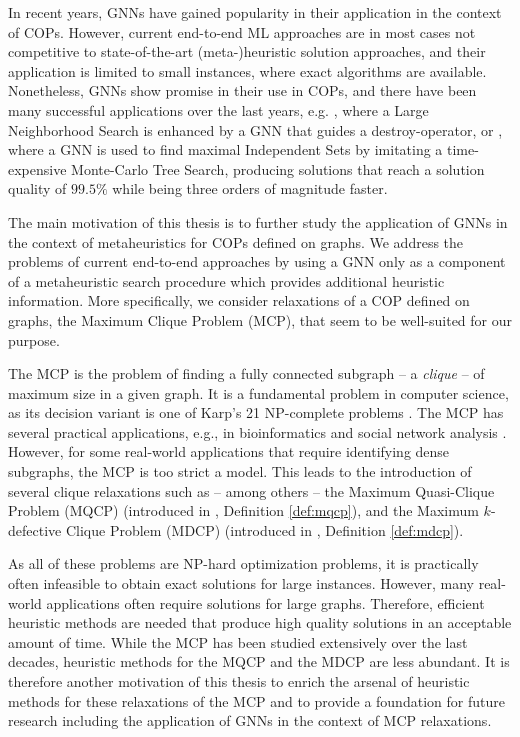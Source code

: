 \documentclass[draft,final]{vutinfth} %
\begin{document}
In recent years, GNNs have gained popularity in their application in the context of COPs. However, current end-to-end ML approaches are in most cases not competitive to state-of-the-art (meta-)heuristic solution approaches, and their application is limited to small instances, where exact algorithms are available. Nonetheless, GNNs show promise in their use in COPs, and there have been many successful applications over the last years, e.g. 
\cite{Oberweger2022}, where a Large Neighborhood Search is enhanced by a GNN that guides a destroy-operator, or \cite{NEURIPS2021_0db2e204}, where a GNN is used to find maximal Independent Sets by imitating a time-expensive Monte-Carlo Tree Search, producing solutions that reach a solution quality of $99.5\%$ while being three orders of magnitude faster. 

The main motivation of this thesis is to further study the application of GNNs in the context of metaheuristics for COPs defined on graphs. We address the problems of current end-to-end approaches by using a GNN only as a component of a metaheuristic search procedure which provides additional heuristic information. More specifically, we consider relaxations of a COP defined on graphs, the Maximum Clique Problem (MCP), that seem to be well-suited for our purpose. 

The MCP is the problem of finding a fully connected subgraph -- a \textit{clique} -- of maximum size in a given graph. It is a fundamental problem in computer science, as its decision variant is one of Karp's 21 NP-complete problems \cite{Karp1972}. The MCP has several practical applications, e.g.,  in bioinformatics \cite{Dognin2010} and social network analysis \cite{Pattillo_network_analysis_2013}. However, for some real-world applications that require identifying dense subgraphs, the MCP is too strict a model. This leads to the introduction of several clique relaxations such as -- among others -- the Maximum Quasi-Clique Problem (MQCP) (introduced in \cite{Abello2002}, Definition \ref{def:mqcp}), and the Maximum $k$-defective Clique Problem (MDCP) (introduced in \cite{Yu2006}, Definition \ref{def:mdcp}). 

As all of these problems are NP-hard optimization problems, it is practically often infeasible to obtain exact solutions for large instances. However, many real-world applications often require solutions for large graphs. Therefore, efficient heuristic methods are needed that produce high quality solutions in an acceptable amount of time. While the MCP has been studied extensively over the last decades, heuristic methods for the MQCP and the MDCP are less abundant. It is therefore another motivation of this thesis to enrich the arsenal of heuristic methods for these relaxations of the MCP and to provide a foundation for future research including the application of GNNs in the context of MCP relaxations. 
\end{document}
